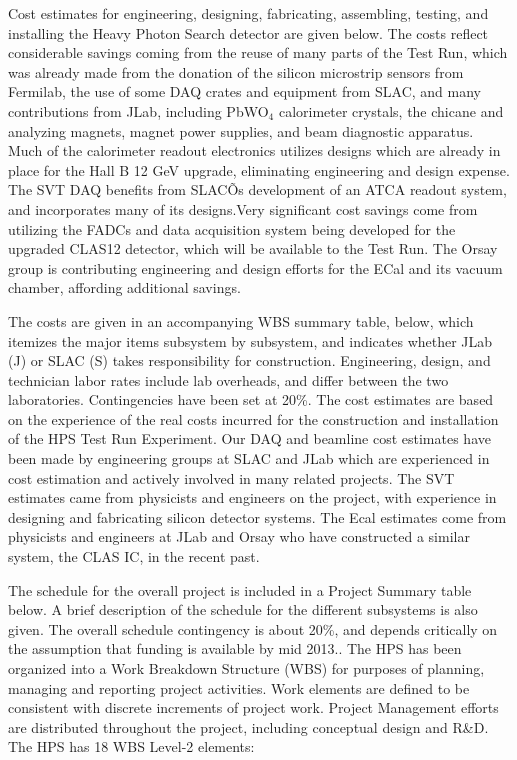 \label{sec:schcost}

Cost estimates for engineering, designing, fabricating, assembling, testing, and installing the Heavy Photon Search detector are given below. The costs reflect considerable savings coming from the reuse of many parts of the Test Run, which was already made from the donation of the silicon microstrip sensors from Fermilab, the use of some DAQ crates and equipment from SLAC, and many contributions from JLab, including PbWO$_4$ calorimeter crystals, the chicane and analyzing magnets, magnet power supplies, and beam diagnostic apparatus. Much of the calorimeter readout electronics utilizes designs which are already in place for the Hall B 12 GeV upgrade, eliminating engineering and design expense. The SVT DAQ benefits from SLACÕs development of an ATCA readout system, and incorporates many of its designs.Very significant cost savings come from utilizing the FADCs and data acquisition system being developed for the upgraded CLAS12 detector, which will be available to the Test Run. The Orsay group is contributing engineering and design efforts for the ECal and its vacuum chamber, affording additional savings. 

The costs are given in an accompanying WBS summary table, below, which itemizes the major items subsystem by subsystem, and indicates whether JLab (J) or SLAC (S) takes responsibility for construction. Engineering, design, and technician labor rates include lab overheads, and differ between the two laboratories. Contingencies have been set at 20\%. The cost estimates are based on the experience of the real costs incurred for the construction and installation of the HPS Test Run Experiment. Our DAQ and beamline cost estimates have been made by engineering groups at SLAC and JLab which are experienced in cost estimation and actively involved in many related projects. The SVT estimates came from physicists and engineers on the project, with experience in designing and fabricating silicon detector systems. The Ecal estimates come from physicists and engineers at JLab and Orsay who have constructed a similar system, the CLAS IC, in the recent past. 

The schedule for the overall project is included in a Project Summary table below. A brief description of the schedule for the different subsystems is also given. The overall schedule contingency is about 20\%, and depends critically on the assumption that funding is available by mid 2013.. The HPS has been organized into a Work Breakdown Structure (WBS) for purposes of planning, managing and reporting project activities. Work elements are defined to be consistent with discrete increments of project work. Project Management efforts are distributed throughout the project, including conceptual design and R\&D. The HPS has 18 WBS Level-2 elements: 

